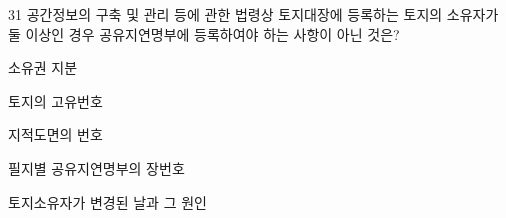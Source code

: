 \begin{question}{31}
공간정보의 구축 및 관리 등에 관한 법령상 토지대장에 등록하는 토지의 소유자가 둘 이상인 경우 공유지연명부에 등록하여야 하는 사항이 아닌 것은?
\begin{choices}
  \item 소유권 지분
  \item 토지의 고유번호
  \item 지적도면의 번호
  \item 필지별 공유지연명부의 장번호
  \item 토지소유자가 변경된 날과 그 원인
\end{choices}
\end{question}
